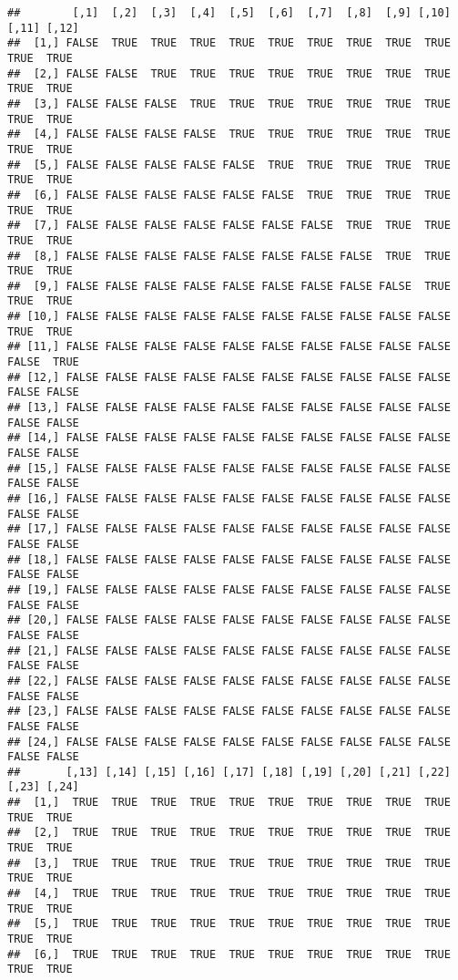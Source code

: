 \documentclass[
]{article}
\begin{document}
\begin{verbatim}
##        [,1]  [,2]  [,3]  [,4]  [,5]  [,6]  [,7]  [,8]  [,9] [,10] [,11] [,12]
##  [1,] FALSE  TRUE  TRUE  TRUE  TRUE  TRUE  TRUE  TRUE  TRUE  TRUE  TRUE  TRUE
##  [2,] FALSE FALSE  TRUE  TRUE  TRUE  TRUE  TRUE  TRUE  TRUE  TRUE  TRUE  TRUE
##  [3,] FALSE FALSE FALSE  TRUE  TRUE  TRUE  TRUE  TRUE  TRUE  TRUE  TRUE  TRUE
##  [4,] FALSE FALSE FALSE FALSE  TRUE  TRUE  TRUE  TRUE  TRUE  TRUE  TRUE  TRUE
##  [5,] FALSE FALSE FALSE FALSE FALSE  TRUE  TRUE  TRUE  TRUE  TRUE  TRUE  TRUE
##  [6,] FALSE FALSE FALSE FALSE FALSE FALSE  TRUE  TRUE  TRUE  TRUE  TRUE  TRUE
##  [7,] FALSE FALSE FALSE FALSE FALSE FALSE FALSE  TRUE  TRUE  TRUE  TRUE  TRUE
##  [8,] FALSE FALSE FALSE FALSE FALSE FALSE FALSE FALSE  TRUE  TRUE  TRUE  TRUE
##  [9,] FALSE FALSE FALSE FALSE FALSE FALSE FALSE FALSE FALSE  TRUE  TRUE  TRUE
## [10,] FALSE FALSE FALSE FALSE FALSE FALSE FALSE FALSE FALSE FALSE  TRUE  TRUE
## [11,] FALSE FALSE FALSE FALSE FALSE FALSE FALSE FALSE FALSE FALSE FALSE  TRUE
## [12,] FALSE FALSE FALSE FALSE FALSE FALSE FALSE FALSE FALSE FALSE FALSE FALSE
## [13,] FALSE FALSE FALSE FALSE FALSE FALSE FALSE FALSE FALSE FALSE FALSE FALSE
## [14,] FALSE FALSE FALSE FALSE FALSE FALSE FALSE FALSE FALSE FALSE FALSE FALSE
## [15,] FALSE FALSE FALSE FALSE FALSE FALSE FALSE FALSE FALSE FALSE FALSE FALSE
## [16,] FALSE FALSE FALSE FALSE FALSE FALSE FALSE FALSE FALSE FALSE FALSE FALSE
## [17,] FALSE FALSE FALSE FALSE FALSE FALSE FALSE FALSE FALSE FALSE FALSE FALSE
## [18,] FALSE FALSE FALSE FALSE FALSE FALSE FALSE FALSE FALSE FALSE FALSE FALSE
## [19,] FALSE FALSE FALSE FALSE FALSE FALSE FALSE FALSE FALSE FALSE FALSE FALSE
## [20,] FALSE FALSE FALSE FALSE FALSE FALSE FALSE FALSE FALSE FALSE FALSE FALSE
## [21,] FALSE FALSE FALSE FALSE FALSE FALSE FALSE FALSE FALSE FALSE FALSE FALSE
## [22,] FALSE FALSE FALSE FALSE FALSE FALSE FALSE FALSE FALSE FALSE FALSE FALSE
## [23,] FALSE FALSE FALSE FALSE FALSE FALSE FALSE FALSE FALSE FALSE FALSE FALSE
## [24,] FALSE FALSE FALSE FALSE FALSE FALSE FALSE FALSE FALSE FALSE FALSE FALSE
##       [,13] [,14] [,15] [,16] [,17] [,18] [,19] [,20] [,21] [,22] [,23] [,24]
##  [1,]  TRUE  TRUE  TRUE  TRUE  TRUE  TRUE  TRUE  TRUE  TRUE  TRUE  TRUE  TRUE
##  [2,]  TRUE  TRUE  TRUE  TRUE  TRUE  TRUE  TRUE  TRUE  TRUE  TRUE  TRUE  TRUE
##  [3,]  TRUE  TRUE  TRUE  TRUE  TRUE  TRUE  TRUE  TRUE  TRUE  TRUE  TRUE  TRUE
##  [4,]  TRUE  TRUE  TRUE  TRUE  TRUE  TRUE  TRUE  TRUE  TRUE  TRUE  TRUE  TRUE
##  [5,]  TRUE  TRUE  TRUE  TRUE  TRUE  TRUE  TRUE  TRUE  TRUE  TRUE  TRUE  TRUE
##  [6,]  TRUE  TRUE  TRUE  TRUE  TRUE  TRUE  TRUE  TRUE  TRUE  TRUE  TRUE  TRUE

\end{verbatim}
\end{document}
